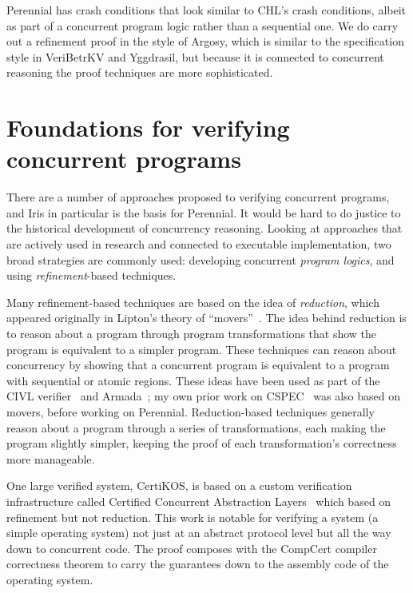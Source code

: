 Perennial has crash conditions that look similar to CHL's crash conditions,
albeit as part of a concurrent program logic rather than a sequential one. We do
carry out a refinement proof in the style of Argosy, which is similar to the
specification style in VeriBetrKV and Yggdrasil, but because it is connected to
concurrent reasoning the proof techniques are more sophisticated.

\section{Foundations for verifying concurrent programs}
\label{sec:rel:concurrency}

There are a number of approaches proposed to verifying concurrent programs, and
Iris in particular is the basis for Perennial. It
would be hard to do justice to the historical development of concurrency
reasoning. Looking at approaches that are actively used in research and
connected to executable implementation, two broad strategies are commonly used:
developing concurrent \emph{program logics}, and using \emph{refinement}-based
techniques.

Many refinement-based techniques are based on the idea of \emph{reduction},
which appeared originally in Lipton's theory of ``movers''~\cite{lipton:movers}.
The idea behind reduction is to reason about a program through program
transformations that show the program is equivalent to a simpler program. These
techniques can reason about concurrency by showing that a concurrent program is
equivalent to a program with sequential or atomic regions. These ideas have been
used as part of the CIVL verifier~\cite{hawblitzel:civl,kragl:civl-layers} and
Armada~\cite{lorch:armada}; my own prior work on CSPEC~\cite{chajed:cspec} was
also based on movers, before working on Perennial. Reduction-based techniques
generally reason about a program through a series of transformations, each
making the program slightly simpler, keeping the proof of each transformation's
correctness more manageable.

One large verified system, CertiKOS, is based on a custom verification
infrastructure called Certified Concurrent Abstraction
Layers~\cite{gu:certikos-ccal} which based on refinement but not reduction. This
work is notable for verifying a system (a simple operating system) not just at
an abstract protocol level but all the way down to concurrent code. The proof
composes with the CompCert compiler correctness theorem to carry the guarantees
down to the assembly code of the operating system.

